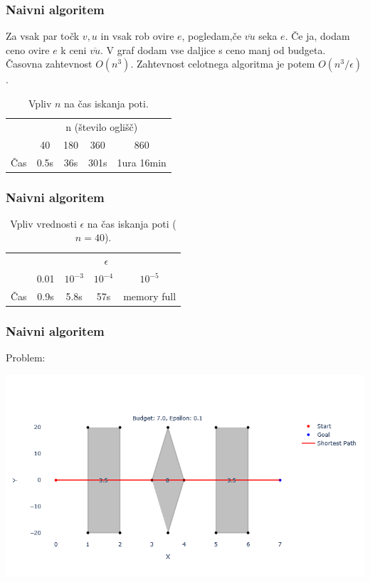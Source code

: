 \documentclass{beamer}
\begin{document}
\begin{frame}
    \frametitle{Naivni algoritem}
    Za vsak par točk $v,u$ in vsak rob ovire $e$, pogledam,če $\overline{vu}$ seka $e$. Če ja, dodam ceno ovire $e$ k ceni $\overline{vu}$. V graf dodam vse daljice s ceno manj od budgeta.
    \pause
    Časovna zahtevnost $O(n^3)$. Zahtevnost celotnega algoritma je potem  $O(n^3/\epsilon)$.
    \pause
    \begin{table}[h]
        \centering
        \begin{tabular}{|c|c|c|c|c|}
            \hline
            & \multicolumn{4}{c|}{n (število oglišč)} \\
            \cline{2-5}
            & 40 & 180 & 360 & 860 \\
            \hline
            Čas & 0.5s & 36s &  301s &  1ura 16min\\
            \hline
        \end{tabular}
        \caption{Vpliv $n$ na čas iskanja poti.}
        \label{tab:1}
    \end{table}

\end{frame}

\begin{frame}
    \frametitle{Naivni algoritem}
   
    \begin{table}[h]
        \centering
        \begin{tabular}{|c|c|c|c|c|}
            \hline
            & \multicolumn{4}{c|}{$\epsilon$} \\
            \cline{2-5}
            & 0.01 & $10^{-3}$ & $10^{-4}$ & $10^{-5}$ \\
            \hline
            Čas & 0.9s & 5.8s &  57s & memory full \\
            \hline
           
        \end{tabular}
        \caption{Vpliv vrednosti $\epsilon$ na čas iskanja poti ($n = 40$).}
        \label{tab:2}
    \end{table}


\end{frame}

\begin{frame}
    \frametitle{Naivni algoritem}
    Problem:

    \includegraphics[width=1\textwidth]{naiveErr.png}
\end{frame}
\end{document}
